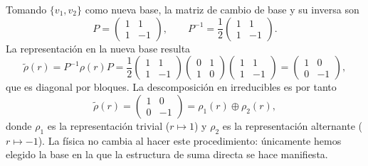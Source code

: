 \documentclass[a4paper,11pt]{book} %
\begin{document}
\noindent
Tomando $\{v_1, v_2\}$ como nueva base, la matriz de cambio de base y su inversa son
\begin{equation}
    P = \begin{pmatrix} 1 & 1 \\ 1 & -1 \end{pmatrix}, \qquad
    P^{-1} = \frac{1}{2}\begin{pmatrix} 1 & 1 \\ 1 & -1 \end{pmatrix}.
\end{equation}
\noindent
La representación en la nueva base resulta
\begin{equation}
    \tilde{\rho}(r) = P^{-1}\rho(r)P =
    \frac{1}{2}\begin{pmatrix} 1 & 1 \\ 1 & -1 \end{pmatrix}
    \begin{pmatrix} 0 & 1 \\ 1 & 0 \end{pmatrix}
    \begin{pmatrix} 1 & 1 \\ 1 & -1 \end{pmatrix}
    = \begin{pmatrix} 1 & 0 \\ 0 & -1 \end{pmatrix},
\end{equation}
\noindent
que es diagonal por bloques. La descomposición en irreducibles es por tanto
\begin{equation}
    \tilde{\rho}(r) = \begin{pmatrix} 1 & 0 \\ 0 & -1 \end{pmatrix}
    = \rho_1(r) \oplus \rho_2(r),
\end{equation}
\noindent
donde $\rho_1$ es la representación trivial ($r \mapsto 1$) y $\rho_2$ es la
representación alternante ($r \mapsto -1$). La física no cambia al hacer este
procedimiento: únicamente hemos elegido la base en la que la estructura de suma
directa se hace manifiesta.
\end{document}
